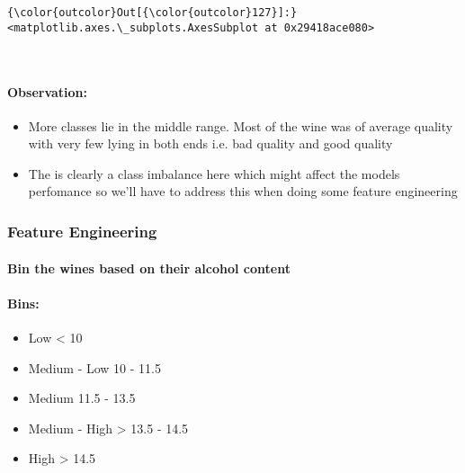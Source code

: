 \documentclass[11pt]{article}
\providecommand{\tightlist}{%
      \setlength{\itemsep}{0pt}\setlength{\parskip}{0pt}}
\begin{document}
\begin{Verbatim}[commandchars=\\\{\}]
{\color{outcolor}Out[{\color{outcolor}127}]:} <matplotlib.axes.\_subplots.AxesSubplot at 0x29418ace080>
\end{Verbatim}
            
    \begin{center}
    \end{center}
    { \hspace*{\fill} \\}
    
    \paragraph{Observation:}\label{observation}

\begin{itemize}
\item
  More classes lie in the middle range. Most of the wine was of average
  quality with very few lying in both ends i.e. bad quality and good
  quality
\item
  The is clearly a class imbalance here which might affect the models
  perfomance so we'll have to address this when doing some feature
  engineering
\end{itemize}

    \subsubsection{Feature Engineering}\label{feature-engineering}

    \paragraph{Bin the wines based on their alcohol
content}\label{bin-the-wines-based-on-their-alcohol-content}

    \paragraph{Bins:}\label{bins}

\begin{itemize}
\tightlist
\item
  Low \textless{} 10
\item
  Medium - Low 10 - 11.5
\item
  Medium 11.5 - 13.5
\item
  Medium - High \textgreater{} 13.5 - 14.5
\item
  High \textgreater{} 14.5
\end{itemize}
\end{document}
